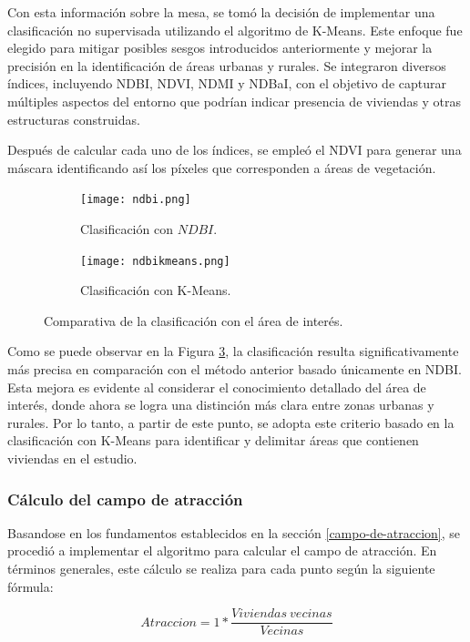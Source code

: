 Con esta información sobre la mesa, se tomó la decisión de implementar una clasificación no supervisada utilizando el algoritmo de K-Means. Este enfoque fue elegido para mitigar posibles sesgos introducidos anteriormente y mejorar la precisión en la identificación de áreas urbanas y rurales. Se integraron diversos índices, incluyendo NDBI, NDVI, NDMI y NDBaI, con el objetivo de capturar múltiples aspectos del entorno que podrían indicar presencia de viviendas y otras estructuras construidas.

Después de calcular cada uno de los índices, se empleó el NDVI para generar una máscara identificando así los píxeles que corresponden a áreas de vegetación.

\begin{figure}[H]
	\begin{subfigure}[b]{0.49\textwidth}
		\texttt{[image: ndbi.png]}
		\caption{Clasificación con $NDBI$.}
		\label{fig:ndbi-calculadora}
	\end{subfigure}
	\hfill
	\begin{subfigure}[b]{0.49\textwidth}
		\texttt{[image: ndbikmeans.png]}
		\caption{Clasificación con K-Means.}
		\label{fig:kmeans}
	\end{subfigure}
	\caption{Comparativa de la clasificación con el área de interés.}
	\label{fig:comparativa-ndbi-kmeans}
\end{figure}

Como se puede observar en la Figura \ref{fig:comparativa-ndbi-kmeans}, la clasificación resulta significativamente más precisa en comparación con el método anterior basado únicamente en NDBI. Esta mejora es evidente al considerar el conocimiento detallado del área de interés, donde ahora se logra una distinción más clara entre zonas urbanas y rurales. Por lo tanto, a partir de este punto, se adopta este criterio basado en la clasificación con K-Means para identificar y delimitar áreas que contienen viviendas en el estudio.

\subsubsection{Cálculo del campo de atracción}

Basandose en los fundamentos establecidos en la sección \ref{campo-de-atraccion}, se procedió a implementar el algoritmo para calcular el campo de atracción. En términos generales, este cálculo se realiza para cada punto según la siguiente fórmula:

$$Atraccion = 1 * \frac{Viviendas~vecinas}{Vecinas}$$

